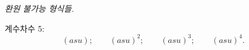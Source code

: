 
\noindent\emph{환원 불가능 형식들.}

\noindent 계수차수 5:
\[
(asu);\qquad (asu)^2;\qquad (asu)^3;\qquad (asu)^4.
\]

